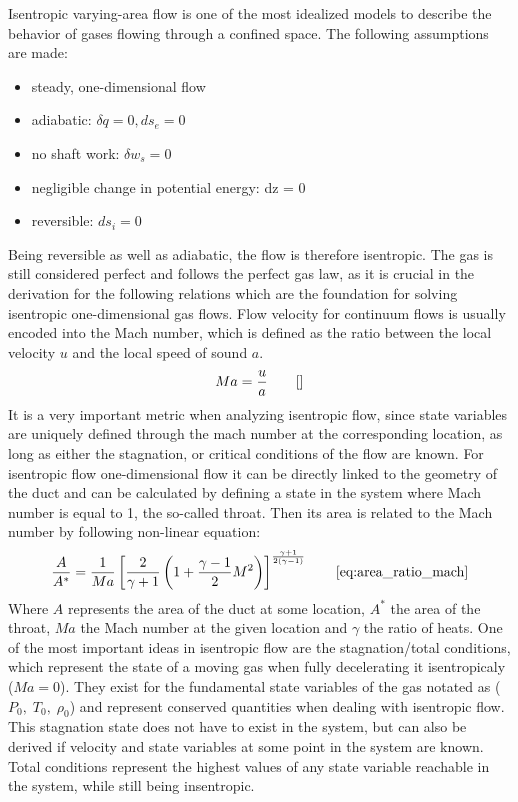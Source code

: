 	Isentropic varying-area flow is one of the most idealized models to describe the behavior of gases flowing through a confined space. The following assumptions are made:
	\begin{itemize}
		\item steady, one-dimensional flow
		\item adiabatic: $\delta q = 0, ds_e = 0$
		\item no shaft work: $\delta w_s = 0$
		\item negligible change in potential energy: dz = 0
		\item reversible: $ds_i = 0$
	\end{itemize}
	Being reversible as well as adiabatic, the flow is therefore isentropic.
	The gas is still considered perfect and follows the perfect gas law, as it is crucial in the derivation for the following relations which are the foundation for solving isentropic one-dimensional gas flows.
	Flow velocity for continuum flows is usually encoded into the Mach number, which is defined as the ratio between the local velocity $u$ and the local speed of sound $a$.
	$$
		Ma = \frac{u}{a}\qquad \eqref{}
	$$
	It is a very important metric when analyzing isentropic flow, since state variables are uniquely defined through the mach number at the corresponding location, as long as either the stagnation, or critical conditions of the flow are known.
	For isentropic flow one-dimensional flow it can be directly linked to the geometry of the duct and can be calculated by defining a state in the system where Mach number is equal to 1, the so-called throat.
	Then its area is related to the Mach number by following non-linear equation:
	$$
		\frac{A}{A^*} = \frac{1}{Ma} \left[ \frac{2}{\gamma + 1} \left( 1 + \frac{\gamma - 1}{2} M^2 \right) \right]^{\frac{\gamma + 1}{2(\gamma - 1)}}
		\qquad \eqref{eq:area_ratio_mach}
	$$
	Where $A$ represents the area of the duct at some location, $A^*$ the area of the throat, $Ma$ the Mach number at the given location and $\gamma$ the ratio of heats.
	One of the most important ideas in isentropic flow are the stagnation/total conditions, which represent the state of a moving gas when fully decelerating it isentropicaly ($Ma = 0$).
	They exist for the fundamental state variables of the gas notated as ($P_0,\;T_0,\;\rho_0$) and represent conserved quantities when dealing with isentropic flow.
	This stagnation state does not have to exist in the system, but can also be derived if velocity and state variables at some point in the system are known.
	Total conditions represent the highest values of any state variable reachable in the system, while still being insentropic.
